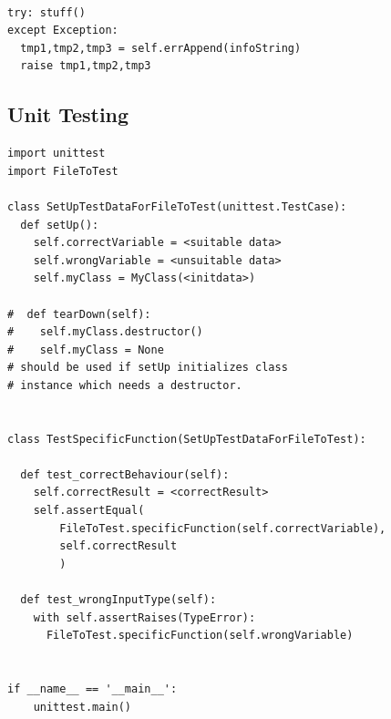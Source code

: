\documentclass[10pt,a4paper]{article}
\begin{document}
\begin{lstlisting}

try: stuff()
except Exception:
  tmp1,tmp2,tmp3 = self.errAppend(infoString)
  raise tmp1,tmp2,tmp3
\end{lstlisting}


\newpage
\subsection{Unit Testing}

\begin{lstlisting}
import unittest
import FileToTest 

class SetUpTestDataForFileToTest(unittest.TestCase):
  def setUp():
    self.correctVariable = <suitable data>
    self.wrongVariable = <unsuitable data>
    self.myClass = MyClass(<initdata>) 
    
#  def tearDown(self):  
#    self.myClass.destructor()  
#    self.myClass = None
# should be used if setUp initializes class  
# instance which needs a destructor.


class TestSpecificFunction(SetUpTestDataForFileToTest):

  def test_correctBehaviour(self):
    self.correctResult = <correctResult>
    self.assertEqual(
        FileToTest.specificFunction(self.correctVariable), 
        self.correctResult
        )

  def test_wrongInputType(self):
    with self.assertRaises(TypeError):
      FileToTest.specificFunction(self.wrongVariable)


if __name__ == '__main__':
    unittest.main()

\end{lstlisting}
\end{document}
